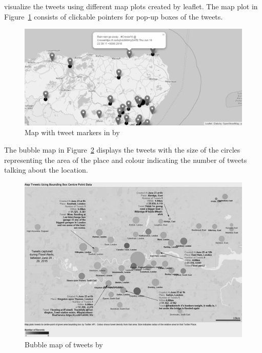  visualize the tweets using different map plots
 created by leaflet. The map plot in Figure~\ref{fig:baker_marker} consists of clickable pointers for pop-up boxes of the tweets.

\begin{figure}[H]
\begin{center}
  \includegraphics[width=13cm]{images/baker_marker.png}
\end{center}
\caption{Map with tweet markers in by }
\label{fig:baker_marker}
\end{figure}

The bubble map in Figure~\ref{fig:baker_bubble} displays the tweets with the size of the circles
representing the area of the place and colour indicating the number of tweets talking about the
location.
\begin{figure}[H]
\begin{center}
  \includegraphics[width=13cm]{./images/baker_bubble.png}
\end{center}
\caption{Bubble map of tweets by }
\label{fig:baker_bubble}
\end{figure}

